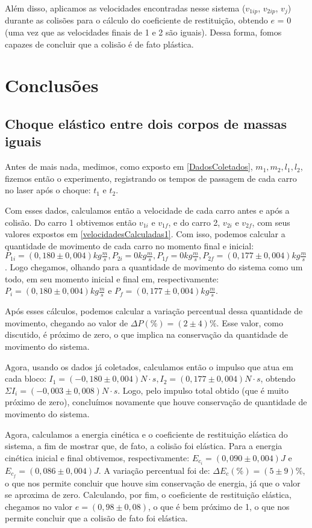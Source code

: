 \documentclass[12pt, twoside]{article}
\begin{document}
    Além disso, aplicamos as velocidades encontradas nesse sistema ($v_{1ip}$, $v_{2ip}$, $v_j$) durante as colisões para o cálculo do coeficiente de restituição, obtendo $e$ = $0$ (uma vez que as velocidades finais de 1 e 2 são iguais). Dessa forma, fomos capazes de concluir que a colisão é de fato plástica.

\section{Conclusões}

\subsection{Choque elástico entre dois corpos de massas iguais}

Antes de mais nada, medimos, como exposto em \ref{DadosColetados}, $m_1, m_2, l_1, l_2$, fizemos então o experimento, registrando os tempos de passagem de cada carro no laser após o choque: $t_1$ e $t_2$.

Com esses dados, calculamos então a velocidade de cada carro antes e após a colisão. Do carro 1 obtivemos então $v_{1i}$ e $v_{1f}$, e do carro 2, $v_{2i}$ e $v_{2f}$, com seus valores expostos em \ref{velocidadesCalculadas1}. Com isso, podemos calcular a quantidade de movimento de cada carro no momento final e inicial: $P_{1i} = (0,180\pm0,004)kg \frac{m}{s}, P_{2i} = 0 kg\frac{m}{s}, P_{1f} = 0 kg \frac{m}{s}, P_{2f} = (0, 177 \pm 0,004)kg \frac{m}{s}$. Logo chegamos, olhando para a quantidade de movimento do sistema como um todo, em seu momento inicial e final em, respectivamente: $P_i = (0,180\pm0,004)kg\frac{m}{s}$ e $P_f = (0,177\pm0,004)kg\frac{m}{s}$.

Após esses cálculos, podemos calcular a variação percentual dessa quantidade de movimento, chegando ao valor de $\Delta P(\%) = (2\pm4)\%$. Esse valor, como discutido, é próximo de zero, o que implica na conservação da quantidade de movimento do sistema.

Agora, usando os dados já coletados, calculamos então o impulso que atua em cada bloco: $I_1 = (-0,180\pm 0,004)N\cdot s, I_2 = (0,177\pm 0,004)N\cdot s$, obtendo $\Sigma I_i = (-0,003 \pm 0,008) N\cdot s$. Logo, pelo impulso total obtido (que é muito próximo de zero), concluímos novamente que houve conservação de quantidade de movimento do sistema.

Agora, calculamos a energia cinética e o coeficiente de restituição elástica do sistema, a fim de mostrar que, de fato, a colisão foi elástica. Para a energia cinética inicial e final obtivemos, respectivamente: $E_{c_i} = (0,090 \pm 0,004)J$ e $E_{c_f} = (0,086\pm0,004)J$. A variação percentual foi de: $\Delta E_c(\%) = (5\pm9)\%$, o que nos permite concluir que houve sim conservação de energia, já que o valor se aproxima de zero. Calculando, por fim, o coeficiente de restituição elástica, chegamos no valor $e = (0,98\pm0,08)$, o que é bem próximo de 1, o que nos permite concluir que a colisão de fato foi elástica.
\end{document}
